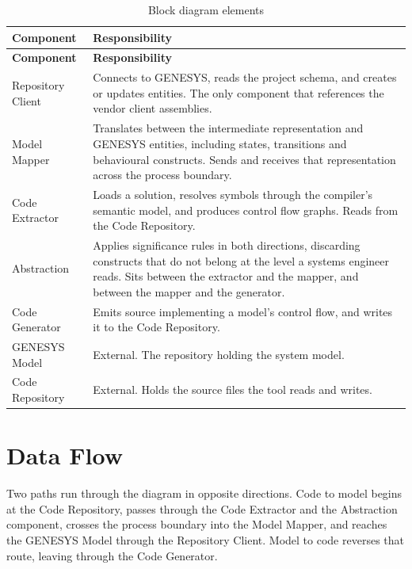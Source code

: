 \begin{longtable}{L{0.22\textwidth}L{0.70\textwidth}}
	\caption{Block diagram elements}\label{tab:block-elements}\\
	\toprule
	\textbf{Component} & \textbf{Responsibility} \\
	\midrule
	\endfirsthead
	\toprule
	\textbf{Component} & \textbf{Responsibility} \\
	\midrule
	\endhead

	Repository Client & Connects to GENESYS, reads the project schema, and creates
	or updates entities. The only component that references the vendor client
	assemblies. \\
	\addlinespace

	Model Mapper & Translates between the intermediate representation and GENESYS
	entities, including states, transitions and behavioural constructs. Sends and
	receives that representation across the process boundary. \\
	\addlinespace

	Code Extractor & Loads a solution, resolves symbols through the compiler's
	semantic model, and produces control flow graphs. Reads from the Code
	Repository. \\
	\addlinespace

	Abstraction & Applies significance rules in both directions, discarding
	constructs that do not belong at the level a systems engineer reads. Sits
	between the extractor and the mapper, and between the mapper and the
	generator. \\
	\addlinespace

	Code Generator & Emits source implementing a model's control flow, and writes
	it to the Code Repository. \\
	\addlinespace

	GENESYS Model & External. The repository holding the system model. \\
	\addlinespace

	Code Repository & External. Holds the source files the tool reads and writes. \\
	\bottomrule
\end{longtable}

\section{Data Flow}

Two paths run through the diagram in opposite directions. Code to model begins
at the Code Repository, passes through the Code Extractor and the Abstraction
component, crosses the process boundary into the Model Mapper, and reaches the
GENESYS Model through the Repository Client. Model to code reverses that route,
leaving through the Code Generator.

